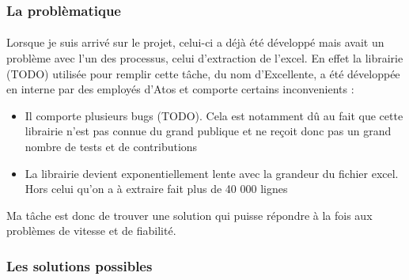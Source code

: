 \documentclass[12pt]{article}
\begin{document}
\begin {sloppypar}
\subsubsection{La problèmatique}
\paragraph {}
Lorsque je suis arrivé sur le projet, celui-ci a déjà été développé mais avait un 
problème avec l'un des processus, celui d'extraction de l'excel. En effet la librairie (TODO)
utilisée pour remplir cette tâche, du nom d'Excellente, a été développée en interne par des 
employés d'Atos et comporte certains inconvenients : 
\begin{itemize}
  \item 
    Il comporte plusieurs bugs (TODO). Cela est notamment dû au fait que cette librairie 
    n'est pas connue du grand publique et ne reçoit donc pas un grand nombre de tests et 
    de contributions 
  \item 
    La librairie devient exponentiellement lente avec la grandeur du fichier excel. Hors
    celui qu'on a à extraire fait plus de 40 000 lignes
\end{itemize}
Ma tâche est donc de trouver une solution qui puisse répondre à la fois aux problèmes
de vitesse et de fiabilité.
\newpage
\subsubsection{Les solutions possibles}

\end{sloppypar}
\end{document}
